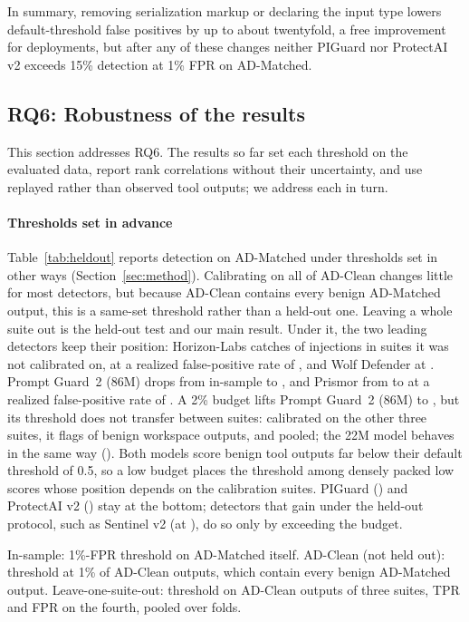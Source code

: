 In summary, removing serialization markup or declaring the input type lowers default-threshold false positives by up to about twentyfold, a free improvement for deployments, but after any of these changes neither PIGuard nor ProtectAI v2 exceeds 15\% detection at 1\% FPR on AD-Matched.

\subsection{RQ6: Robustness of the results}
\label{sec:robust}

This section addresses RQ6. The results so far set each threshold on the evaluated data, report rank correlations without their uncertainty, and use replayed rather than observed tool outputs; we address each in turn.

\paragraph{Thresholds set in advance}
Table~\ref{tab:heldout} reports detection on AD-Matched under thresholds set in other ways (Section~\ref{sec:method}). Calibrating on all of AD-Clean changes little for most detectors, but because AD-Clean contains every benign AD-Matched output, this is a same-set threshold rather than a held-out one. Leaving a whole suite out is the held-out test and our main result. Under it, the two leading detectors keep their position: Horizon-Labs catches \LoHZTpr of injections in suites it was not calibrated on, at a realized false-positive rate of \LoHZFpr, and Wolf Defender \LoWFTpr at \LoWFFpr. Prompt Guard~2 (86M) drops from \MPGtAD in-sample to \LoPGtTpr, and Prismor from \MPRAD to \LoPRTpr at a realized false-positive rate of \LoPRFpr. A 2\% budget lifts Prompt Guard~2 (86M) to \LoPGtTprTwo, but its threshold does not transfer between suites: calibrated on the other three suites, it flags \LoPGtWsFprTwo of benign workspace outputs, and \LoPGtFprTwo pooled; the 22M model behaves in the same way (\LoPGtsFprTwo). Both models score benign tool outputs far below their default threshold of 0.5, so a low budget places the threshold among densely packed low scores whose position depends on the calibration suites. PIGuard (\LoPGTpr) and ProtectAI v2 (\LoPATpr) stay at the bottom; detectors that gain under the held-out protocol, such as Sentinel v2 (\LoRSTpr at \LoRSFpr), do so only by exceeding the budget.

\begin{table}[t]
\centering\small
\caption{Detection (TPR) and realized false-positive rate (FPR) on AgentDojo under three ways of setting the threshold, in percent. Best value per column in bold.}
\label{tab:heldout}

\par\smallskip\footnotesize\raggedright
In-sample: 1\%-FPR threshold on AD-Matched itself. AD-Clean (not held out): threshold at 1\% of AD-Clean outputs, which contain every benign AD-Matched output. Leave-one-suite-out: threshold on AD-Clean outputs of three suites, TPR and FPR on the fourth, pooled over folds.
\end{table}

